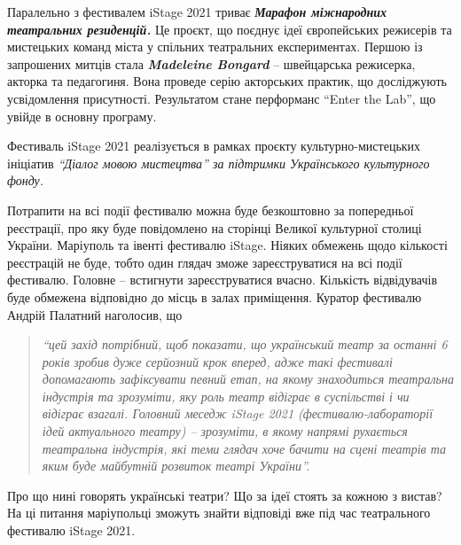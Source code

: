 
Паралельно з фестивалем iStage 2021 триває \emph{\textbf{Марафон міжнародних театральних
резиденцій.}} Це проєкт, що поєднує ідеї європейських режисерів та мистецьких
команд міста у спільних театральних експериментах. Першою із запрошених митців
стала \emph{\textbf{Madeleine Bongard}} –  швейцарська режисерка, акторка та педагогиня. Вона
проведе серію акторських практик, що досліджують усвідомлення присутності.
Результатом стане перформанс \enquote{Enter the Lab}, що увійде в основну програму.

Фестиваль iStage 2021 реалізується в рамках проєкту культурно-мистецьких
ініціатив \emph{\enquote{Діалог мовою мистецтва} за підтримки Українського культурного фонду.}

Потрапити на всі події фестивалю можна буде безкоштовно за попередньої
реєстрації, про яку буде повідомлено на сторінці Великої культурної столиці
України. Маріуполь та івенті фестивалю iStage. Ніяких обмежень щодо кількості
реєстрацій не буде, тобто один глядач зможе зареєструватися на всі події
фестивалю. Головне – встигнути зареєструватися вчасно. Кількість відвідувачів
буде обмежена відповідно до місць в залах приміщення. Куратор фестивалю Андрій
Палатний наголосив, що 
\begin{quote}
\em\enquote{цей захід потрібний, щоб показати, що український театр
за останні 6 років зробив дуже серйозний крок вперед, адже такі фестивалі
допомагають зафіксувати певний етап, на якому знаходиться театральна індустрія
та зрозуміти, яку роль театр відіграє в суспільстві і чи відіграє взагалі.
Головний меседж iStage 2021 (фестивалю-лабораторії ідей актуального театру) –
зрозуміти, в якому напрямі рухається театральна індустрія, які теми глядач хоче
бачити на сцені театрів та яким буде майбутній розвиток театрі України}.
\end{quote}

Про що нині говорять українські театри? Що за ідеї стоять за кожною з вистав?
На ці питання маріупольці зможуть знайти відповіді вже під час театрального
фестивалю iStage 2021.
